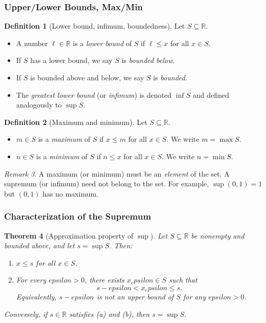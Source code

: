 \documentclass[12pt]{article}
\numberwithin{equation}{section}
\def\eps{epsilon}
\newcommand{\RR}{\mathbb{R}}
\newcommand{\eps}{\varepsilon}               %
\theoremstyle{plain}
\newtheorem{theorem}{Theorem}[section]
\theoremstyle{definition}
\newtheorem{definition}[theorem]{Definition}
\theoremstyle{remark}
\newtheorem{remark}[theorem]{Remark}
\begin{document}
\subsubsection{Upper/Lower Bounds, Max/Min}

\begin{definition}[Lower bound, infimum, boundedness]
Let $S\subseteq\RR$.
\begin{itemize}
\item A number $\ell\in\RR$ is a \emph{lower bound} of $S$ if $\ell\le x$ for all $x\in S$.
\item If $S$ has a lower bound, we say $S$ is \emph{bounded below}.
\item If $S$ is bounded above and below, we say $S$ is \emph{bounded}.
\item The \emph{greatest lower bound} (or \emph{infimum}) is denoted $\inf S$ and defined analogously to $\sup S$.
\end{itemize}
\end{definition}

\begin{definition}[Maximum and minimum]
Let $S\subseteq\RR$.
\begin{itemize}
\item $m\in S$ is a \emph{maximum} of $S$ if $x\le m$ for all $x\in S$. We write $m=\max S$.
\item $n\in S$ is a \emph{minimum} of $S$ if $n\le x$ for all $x\in S$. We write $n=\min S$.
\end{itemize}
\end{definition}

\begin{remark}
A maximum (or minimum) must be an \emph{element} of the set. A supremum (or infimum) need not belong to the set.
For example, $\sup(0,1)=1$ but $(0,1)$ has no maximum.
\end{remark}

\subsubsection{Characterization of the Supremum}

\begin{theorem}[Approximation property of $\sup$]\label{thm:sup-approx}
Let $S\subseteq\RR$ be nonempty and bounded above, and let $s=\sup S$. Then:
\begin{enumerate}[label=(\alph*)]
\item $x\le s$ for all $x\in S$.
\item For every $\eps>0$, there exists $x_\eps\in S$ such that
\[
s-\eps < x_\eps \le s.
\]
Equivalently, $s-\eps$ is \emph{not} an upper bound of $S$ for any $\eps>0$.
\end{enumerate}
Conversely, if $s\in\RR$ satisfies (a) and (b), then $s=\sup S$.
\end{theorem}
\end{document}
